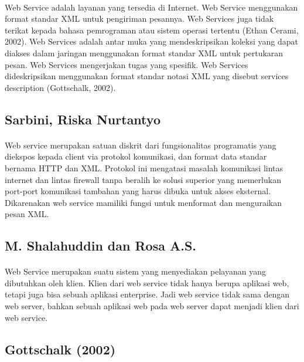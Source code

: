 \documentclass[12pt]{article}
\begin{document}
\paragraph{}
Web Service adalah layanan yang tersedia di Internet. Web Service menggunakan format standar XML untuk pengiriman pesannya. Web Services juga tidak terikat kepada bahasa pemrograman atau sistem operasi tertentu (Ethan Cerami, 2002). Web Services adalah antar muka yang mendeskripsikan koleksi yang dapat diakses dalam jaringan menggunakan format standar XML untuk pertukaran pesan. Web Services mengerjakan tugas yang spesifik. Web Services dideskripsikan menggunakan format standar notasi XML yang disebut services description (Gottschalk, 2002)\cite{chen2014web}.

\subsection{Sarbini, Riska Nurtantyo}
\paragraph{}
Web service merupakan satuan diskrit dari fungsionalitas programatis yang diekspos 
kepada client via protokol komunikasi, dan format data standar bernama HTTP dan 
XML. Protokol ini mengatasi masalah komunikasi lintas internet dan lintas 
firewall tanpa beralih ke solusi superior yang memerlukan port-port komunikasi 
tambahan yang harus dibuka untuk akses eksternal. Dikarenakan web service mamiliki fungsi untuk menformat dan menguraikan pesan XML\cite{sarbini2015pengembangan}. 

\subsection{M. Shalahuddin dan Rosa A.S.}
\paragraph{}
Web Service merupakan suatu sistem yang menyediakan pelayanan yang dibutuhkan oleh klien. Klien dari web service tidak hanya berupa aplikasi web, tetapi juga bisa sebuah aplikasi enterprise. Jadi web service tidak sama dengan web server, bahkan sebuah aplikasi web pada web server dapat menjadi klien dari web service\cite{inayah2014aplikasi}.

\subsection{Gottschalk (2002)}
\end{document}
